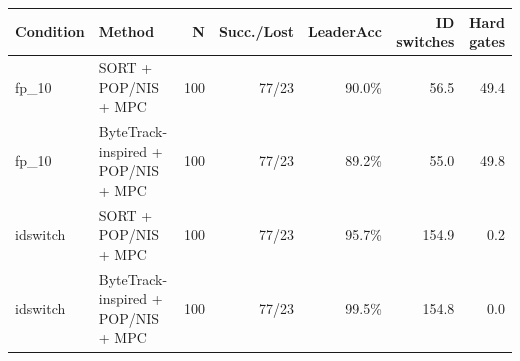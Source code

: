 \begin{tabular}{llrrrrr}
\toprule
\textbf{Condition} & \textbf{Method} & \textbf{N} & \textbf{Succ./Lost} & \textbf{LeaderAcc} & \textbf{ID switches} & \textbf{Hard gates} \\
\midrule
fp\_10 & SORT + POP/NIS + MPC & 100 & 77/23 & 90.0\% & 56.5 & 49.4 \\
fp\_10 & ByteTrack-inspired + POP/NIS + MPC & 100 & 77/23 & 89.2\% & 55.0 & 49.8 \\
idswitch & SORT + POP/NIS + MPC & 100 & 77/23 & 95.7\% & 154.9 & 0.2 \\
idswitch & ByteTrack-inspired + POP/NIS + MPC & 100 & 77/23 & 99.5\% & 154.8 & 0.0 \\
\bottomrule
\end{tabular}
